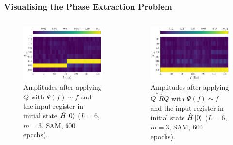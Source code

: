 \documentclass{beamer}
\begin{document}
\begin{frame}
\frametitle{Visualising the Phase Extraction Problem}
\begin{columns}
\begin{column}{0.5\textwidth}
\begin{figure}
\centering 
\includegraphics[width=\textwidth]{im/Q_amp_linear_H}
\caption{Amplitudes after applying $\tilde{Q}$ with $\Psi(f) \sim f$ and the input register in initial state $\hat{H} \ket{0}$ ($L=6$, $m=3$, SAM, 600 epochs). }
\end{figure}
\end{column}
\begin{column}{0.5\textwidth}
\begin{figure}
\centering 
\includegraphics[width=\textwidth]{im/QRQ_amp_linear_H}
\caption{Amplitudes after applying $\tilde{Q}^\dagger \hat{R} \tilde{Q}$ with $\Psi(f) \sim f$ and the input register in initial state $\hat{H} \ket{0}$ ($L=6$, $m=3$, SAM, 600 epochs). }
\end{figure}
\end{column}
\end{columns}
\end{frame}
\end{document}
